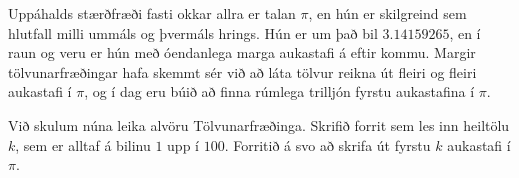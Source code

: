 
Uppáhalds stærðfræði fasti okkar allra er talan $\pi$, en hún er skilgreind sem
hlutfall milli ummáls og þvermáls hrings. Hún er um það bil $3.14159265$, en í
raun og veru er hún með óendanlega marga aukastafi á eftir kommu. Margir
tölvunarfræðingar hafa skemmt sér við að láta tölvur reikna út fleiri og fleiri
aukastafi í $\pi$, og í dag eru búið að finna rúmlega trilljón fyrstu
aukastafina í $\pi$.

Við skulum núna leika alvöru Tölvunarfræðinga. Skrifið forrit sem les inn
heiltölu $k$, sem er alltaf á bilinu $1$ upp í $100$. Forritið á svo að skrifa
út fyrstu $k$ aukastafi í $\pi$.

